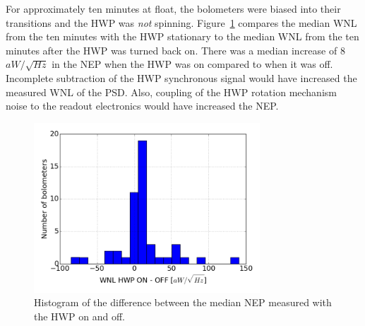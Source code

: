 For approximately ten minutes at float, the bolometers were biased into their transitions and the \ac{HWP} was \textit{not} spinning. 
Figure~\ref{fig:hwp_on_vs_off} compares the median \ac{WNL} from the ten minutes with the \ac{HWP} stationary to the median \ac{WNL} from the ten minutes after the \ac{HWP} was turned back on. 
There was a median increase of 8 $aW/\sqrt{Hz}$ in the \ac{NEP} when the \ac{HWP} was on compared to when it was off. 
Incomplete subtraction of the \ac{HWP} synchronous signal would have increased the measured \ac{WNL} of the \ac{PSD}. 
Also, coupling of the \ac{HWP} rotation mechanism noise to the readout electronics would have increased the \ac{NEP}. 


\begin{figure}[ht!]
\begin{center}
\includegraphics[height=2.5in]{figures/hwp_on_and_off_median_diff_histogram.png}
\caption[Histogram of difference between noise measured with the HWP on and off]{Histogram of the difference between the median \ac{NEP} measured with the \ac{HWP} on and off. 
\label{fig:hwp_on_vs_off} }
\end{center}
\end{figure}



